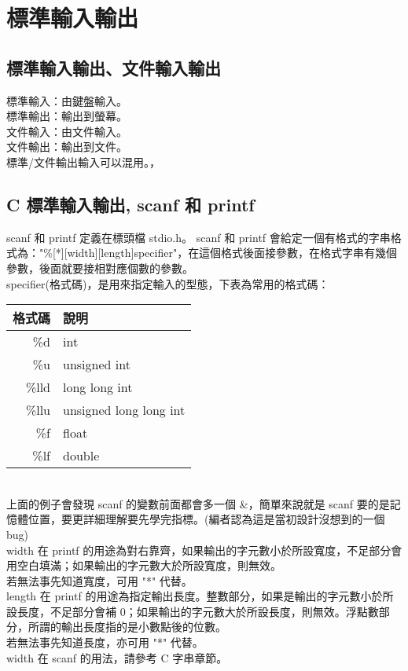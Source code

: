 \section{標準輸入輸出}
\subsection{標準輸入輸出、文件輸入輸出}
標準輸入：由鍵盤輸入。\\
標準輸出：輸出到螢幕。\\
文件輸入：由文件輸入。\\
文件輸出：輸出到文件。\\
標準/文件輸出輸入可以混用。，
\subsection{C 標準輸入輸出, scanf 和 printf}
scanf 和 printf 定義在標頭檔 stdio.h。
scanf 和 printf 會給定一個有格式的字串格式為："\%[*][width][length]specifier"，在這個格式後面接參數，在格式字串有幾個參數，後面就要接相對應個數的參數。\\

specifier(格式碼)，是用來指定輸入的型態，下表為常用的格式碼：\\
\begin{tabular}{|r|l|} \hline 格式碼 & 說明 \\\hline \%d & int \\\hline \%u & unsigned int \\\hline \%lld & long long int \\\hline \%llu & unsigned long long int \\\hline \%f & float \\\hline \%lf & double \\\hline \end{tabular}\\

上面的例子會發現 scanf 的變數前面都會多一個 \&，簡單來說就是 scanf 要的是記憶體位置，要更詳細理解要先學完指標。(編者認為這是當初設計沒想到的一個 bug) \\
width 在 printf 的用途為對右靠齊，如果輸出的字元數小於所設寬度，不足部分會用空白填滿；如果輸出的字元數大於所設寬度，則無效。\\

若無法事先知道寬度，可用 "*" 代替。\\

length 在 printf 的用途為指定輸出長度。整數部分，如果是輸出的字元數小於所設長度，不足部分會補 $0$；如果輸出的字元數大於所設長度，則無效。浮點數部分，所謂的輸出長度指的是小數點後的位數。\\

若無法事先知道長度，亦可用 "*" 代替。\\

width 在 scanf 的用法，請參考 C 字串章節。\\
